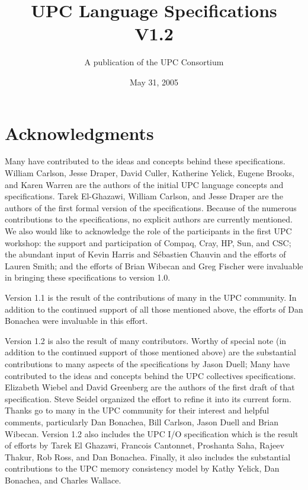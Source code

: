 \documentclass[12pt,titlepage]{article}
\title{UPC Language Specifications\\
V1.2 }
\author{A publication of the UPC Consortium}
\date {May 31, 2005}
\newcounter{parnum}
\newcommand{\tab}{\textt{~~~~~~}}
\newcommand{\np}{
  \addtocounter{parnum}{1}
  \latex{\hspace{-2em}\makebox[2em][l]{\arabic{parnum}}}
  \html{{\bf {\arabic{parnum}}}\tab}}
\newcommand{\npf}{\setcounter{parnum}{0}\np}
\begin{document}
\maketitle

\setcounter{page}{2}
\section*{Acknowledgments}
                                             
\npf Many have contributed to the ideas and concepts behind
    these specifications.  William Carlson, Jesse Draper,  David Culler, 
Katherine Yelick,
Eugene Brooks, and Karen Warren are the authors of the initial
UPC language concepts and specifications. Tarek El-Ghazawi, 
William Carlson, and Jesse Draper are the authors of the first formal
version of the specifications.  Because of the numerous contributions
to the specifications, no explicit authors are currently mentioned.
We also would like to
acknowledge the role of the participants in the first UPC workshop:
the support and participation of Compaq, Cray, HP, Sun,
and CSC; the abundant input of
Kevin Harris and S\'{e}bastien Chauvin and the efforts of Lauren
Smith; and the efforts of Brian Wibecan and Greg Fischer were
invaluable in bringing these specifications to version 1.0.

\np Version 1.1 is the result of the contributions of many in the UPC
community.  In addition to the
continued support of all those mentioned above, the efforts of Dan
Bonachea were invaluable in this effort.

\np Version 1.2 is also the result of many contributors.  Worthy of special
note (in addition to the
continued support of those mentioned above) are the substantial 
contributions to many aspects of the specifications by Jason Duell;
Many have contributed to the ideas and concepts behind the
UPC collectives specifications.
Elizabeth Wiebel and David Greenberg are the authors of the first draft of
that specification.  Steve Seidel organized the effort to
refine it into its current form.
Thanks go to many in the UPC community for their interest and helpful
comments, particularly Dan Bonachea, Bill Carlson, Jason Duell and
Brian Wibecan.
Version 1.2 also includes the UPC I/O specification which is the result of
efforts by Tarek El Ghazawi, Francois Cantonnet, Proshanta Saha, Rajeev Thakur,
Rob Ross, and Dan Bonachea.
Finally, it also includes the substantial contributions to the UPC memory consistency
model by Kathy Yelick, Dan Bonachea, and Charles Wallace.
\end{document}
